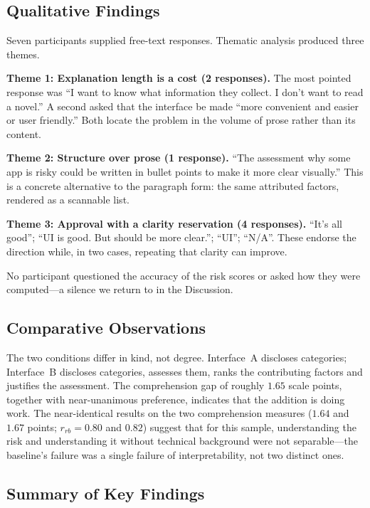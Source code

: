 \documentclass[sigconf]{acmart}
\begin{document}
\subsection{Qualitative Findings}

Seven participants supplied free-text responses. Thematic analysis
produced three themes.

\textbf{Theme 1: Explanation length is a cost (2 responses).} The most
pointed response was ``I want to know what information they collect. I
don't want to read a novel.'' A second asked that the interface be made
``more convenient and easier or user friendly.'' Both locate the problem in
the volume of prose rather than its content.

\textbf{Theme 2: Structure over prose (1 response).} ``The assessment why
some app is risky could be written in bullet points to make it more clear
visually.'' This is a concrete alternative to the paragraph form: the same
attributed factors, rendered as a scannable list.

\textbf{Theme 3: Approval with a clarity reservation (4 responses).}
``It's all good''; ``UI is good. But should be more clear.''; ``UI'';
``N/A''. These endorse the direction while, in two cases, repeating that
clarity can improve.

No participant questioned the accuracy of the risk scores or asked how they
were computed---a silence we return to in the Discussion.

\subsection{Comparative Observations}

The two conditions differ in kind, not degree. Interface~A discloses
categories; Interface~B discloses categories, assesses them, ranks the
contributing factors and justifies the assessment. The comprehension gap of
roughly $1.65$ scale points, together with near-unanimous preference,
indicates that the addition is doing work. The near-identical results on
the two comprehension measures ($1.64$ and $1.67$ points; $r_{rb}=0.80$ and
$0.82$) suggest that for this sample, understanding the risk and
understanding it without technical background were not separable---the
baseline's failure was a single failure of interpretability, not two
distinct ones.

\subsection{Summary of Key Findings}
\end{document}
